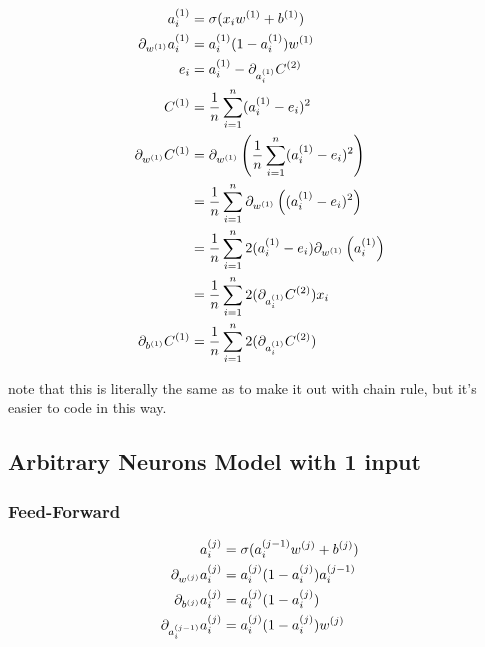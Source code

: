 \documentclass{article}
\def \d{2}
\begin{document}
\begin{align}
  a_{i}^{(1)} &= \sigma(x_{i}w^{(1)} + b^{(1)}) \\
  \pd[w^{(1)}] a_{i}^{(1)} &= a_{i}^{(1)} (1 - a_{i}^{(1)}) w^{(1)} \\
  e_{i} &= a_{i}^{(1)} - \pd[a_{i}^{(1)}] C^{(2)} \\
  C^{(1)} &= \avgsum[i, n] (a_{i}^{(1)} - e_{i})^{2} \\
  \pd[w^{(1)}] C^{(1)} &= \pd[w^{(1)}] \left( \avgsum[i, n] (a_{i}^{(1)} - e_{i})^{2} \right) \\
                       &= \avgsum[i, n] \pd[w^{(1)}] \left( (a_{i}^{(1)} - e_{i})^{2} \right) \\
                       &= \avgsum[i, n] 2 (a_{i}^{(1)} - e_{i}) \pd[w^{(1)}] \left( a_{i}^{(1)} \right) \\
                       &= \avgsum[i, n] 2 (\pd[a_{i}^{(1)}] C^{(2)}) x_{i} \\
  \pd[b^{(1)}] C^{(1)} &= \avgsum[i, n] 2 (\pd[a_{i}^{(1)}] C^{(2)})
\end{align}

note that this is literally the same as to make it out with chain rule, but it's easier to code in this way.

\subsection{Arbitrary Neurons Model with 1 input}

\begin{center}
\end{center}

\subsubsection{Feed-Forward}

\begin{align}
  a_{i}^{(j)} &= \sigma(a_{i}^{(j-1)}w^{(j)} + b^{(j)}) \\
  \pd[w^{(j)}] a_{i}^{(j)} &= a_{i}^{(j)} (1 - a_{i}^{(j)}) a_{i}^{(j-1)} \\
  \pd[b^{(j)}] a_{i}^{(j)} &= a_{i}^{(j)} (1 - a_{i}^{(j)}) \\
  \pd[a_{i}^{(j-1)}] a_{i}^{(j)} &= a_{i}^{(j)} (1 - a_{i}^{(j)}) w^{(j)}
\end{align}
\end{document}
